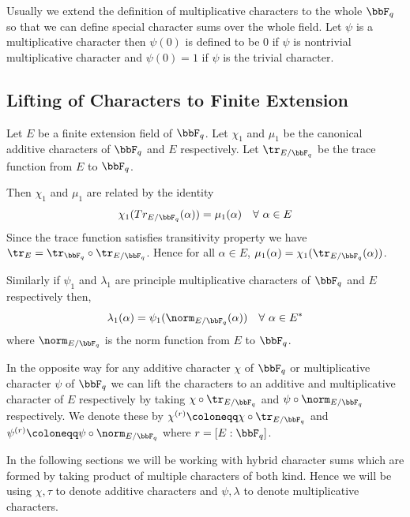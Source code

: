 Usually we extend the definition of multiplicative characters to the whole $\bbF_q$ so that we can define special character sums over the whole field. Let $\psi$ is a multiplicative character then $\psi(0)$ is defined to be $0$ if $\psi$ is nontrivial multiplicative character and $\psi(0)=1$ if $\psi$ is the trivial character.
\subsection{Lifting of Characters to Finite Extension}\label{sec:lifting-chars}
Let $E$ be a finite extension field of $\bbF_q$. Let $\chi_1$ and $\mu_1$ be the canonical additive characters of $\bbF_q$ and $E$ respectively. Let $\tr_{E/\bbF_q}$ be the trace function from $E$ to $\bbF_q$.

Then $\chi_1$ and $\mu_1$ are related by the identity $$\chi_1(Tr_{E/\bbF_q}(\alpha))=\mu_1(\alpha) \quad \forall\ \alpha\in E$$Since the trace function satisfies transitivity property we have $\tr_E=\tr_{\bbF_q}\circ\tr_{E/\bbF_q}$. Hence for all $\alpha\in E$, $\mu_1(\alpha)=\chi_1(\tr_{E/\bbF_q}(\alpha))$.

Similarly if $\psi_1$ and $\lambda_1$ are principle multiplicative characters of $\bbF_q$ and $E$ respectively then, $$\lambda_1(\alpha)=\psi_1(\norm_{E/\bbF_q}(\alpha))\quad \forall\ \alpha\in E^*$$ where $\norm_{E/\bbF_q}$ is the norm function from $E$ to $\bbF_q$.

In the opposite way for any additive character $\chi$ of $\bbF_q$ or multiplicative character $\psi$ of $\bbF_q$ we can lift the characters to an additive and multiplicative character of $E$ respectively by taking $\chi\circ\tr_{E/\bbF_q}$ and $\psi\circ\norm_{E/\bbF_q}$ respectively. We denote these by $\chi^{(r)}\coloneqq \chi\circ\tr_{E/\bbF_q}$ and $\psi^{(r)}\coloneqq \psi\circ\norm_{E/\bbF_q}$ where $r=[E:\bbF_q]$.

In the following sections we will be working with hybrid character sums which are formed by taking product of multiple characters of both kind. Hence we will be using $\chi,\tau$ to denote additive characters and $\psi, \lambda$ to denote multiplicative characters.